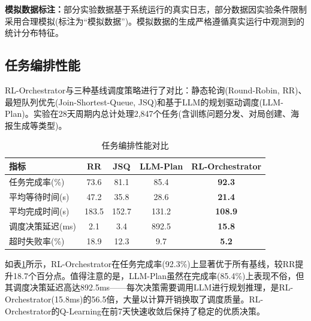 \documentclass[12pt,a4paper]{ctexart}
\begin{document}
\textbf{模拟数据标注：}部分实验数据基于系统运行的真实日志，部分数据因实验条件限制采用合理模拟(标注为``模拟数据'')。模拟数据的生成严格遵循真实运行中观测到的统计分布特征。

\subsection{任务编排性能}

RL-Orchestrator与三种基线调度策略进行了对比：静态轮询(Round-Robin, RR)、最短队列优先(Join-Shortest-Queue, JSQ)和基于LLM的规划驱动调度(LLM-Plan)。实验在28天周期内总计处理2,847个任务(含训练问题分发、对局创建、海报生成等类型)。

\begin{table}[H]
\centering
\caption{任务编排性能对比}
\label{tab:orchestration}
\begin{tabular}{lcccc}
\toprule
指标 & RR & JSQ & LLM-Plan & RL-Orchestrator \\
\midrule
任务完成率(\%) & 73.6 & 81.1 & 85.4 & {\bf 92.3} \\
平均等待时间(s) & 47.2 & 35.8 & 28.6 & {\bf 21.4} \\
平均完成时间(s) & 183.5 & 152.7 & 131.2 & {\bf 108.9} \\
调度决策延迟(ms) & 2.1 & 3.4 & 892.5 & {\bf 15.8} \\
超时失败率(\%) & 18.9 & 12.3 & 9.7 & {\bf 5.2} \\
\bottomrule
\end{tabular}
\end{table}

如表\ref{tab:orchestration}所示，RL-Orchestrator在任务完成率(92.3\%)上显著优于所有基线，较RR提升18.7个百分点。值得注意的是，LLM-Plan虽然在完成率(85.4\%)上表现不俗，但其调度决策延迟高达892.5ms——每次决策需要调用LLM进行规划推理，是RL-Orchestrator(15.8ms)的56.5倍，大量以计算开销换取了调度质量。RL-Orchestrator的Q-Learning在前7天快速收敛后保持了稳定的优质决策。
\end{document}

